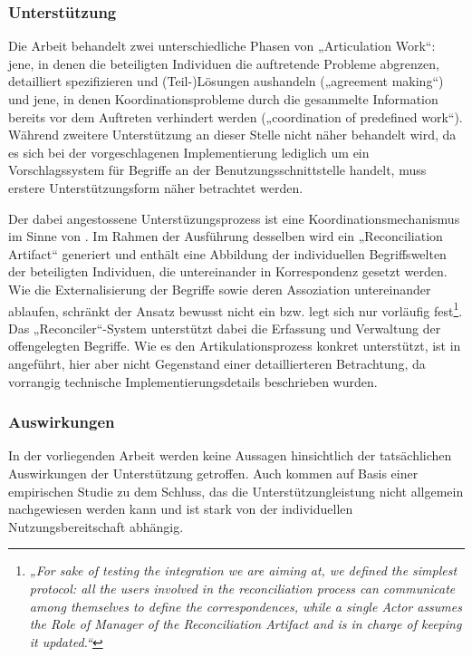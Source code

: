 \subsubsection{Unterstützung}

Die Arbeit behandelt zwei unterschiedliche Phasen von „Articulation Work“: jene, in denen die beteiligten Individuen die auftretende Probleme abgrenzen, detailliert spezifizieren und (Teil-)Lösungen aushandeln („agreement making“) und jene, in denen Koordinationsprobleme durch die gesammelte Information bereits vor dem Auftreten verhindert werden („coordination of predefined work“). Während zweitere Unterstützung an dieser Stelle nicht näher behandelt wird, da es sich bei der vorgeschlagenen Implementierung lediglich um ein Vorschlagssystem für Begriffe an der Benutzungsschnittstelle handelt, muss erstere Unterstützungsform näher betrachtet werden.

Der dabei angestossene Unterstüzungsprozess ist eine Koordinationsmechanismus im Sinne von \citet{Divitini00}. Im Rahmen der Ausführung desselben wird ein „Reconciliation Artifact“ generiert und enthält eine Abbildung der individuellen Begriffswelten der beteiligten Individuen, die untereinander in Korrespondenz gesetzt werden. Wie die Externalisierung der Begriffe sowie deren Assoziation untereinander ablaufen, schränkt der Ansatz bewusst nicht ein bzw. legt sich nur vorläufig fest\footnote{\emph{„For sake of testing the integration we are aiming at, we defined the simplest protocol: all the users involved in the reconciliation process can communicate among themselves to define the correspondences, while a single Actor assumes the Role of Manager of the Reconciliation Artifact and is in charge of keeping it updated.“}\citep[][S. 10]{Sarini02}}. Das „Reconciler“-System unterstützt dabei die Erfassung und Verwaltung der offengelegten Begriffe. Wie es den Artikulationsprozess konkret unterstützt, ist in \citet{Mark02a} angeführt, hier aber nicht Gegenstand einer detaillierteren Betrachtung, da vorrangig technische Implementierungsdetails beschrieben wurden.

\subsubsection{Auswirkungen}

In der vorliegenden Arbeit werden keine Aussagen hinsichtlich der tatsächlichen Auswirkungen der Unterstützung getroffen. Auch \citet{Mark02a} kommen auf Basis einer empirischen Studie zu dem Schluss, das die Unterstützungleistung nicht allgemein nachgewiesen werden kann und ist stark von der individuellen Nutzungsbereitschaft abhängig.


